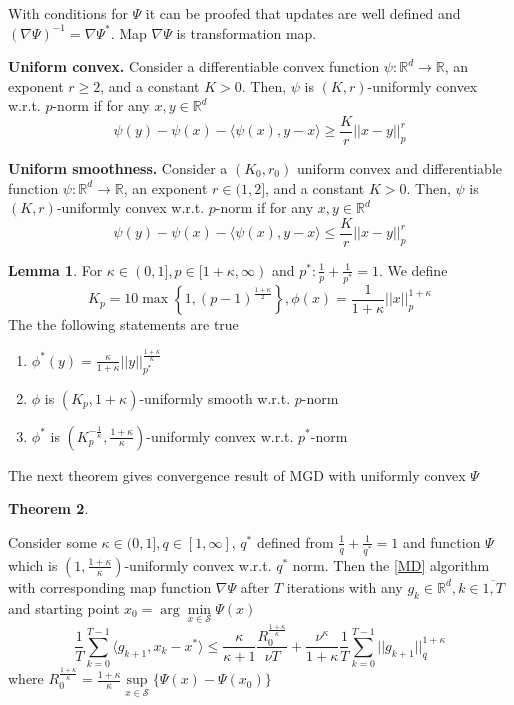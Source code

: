 \documentclass{article}
\newcommand{\RR}{\mathcal{R}}
\theoremstyle{definition}
\newtheorem{theorem}{Theorem}
\newtheorem{lemma}[theorem]{Lemma}
\theoremstyle{remark}
\def\RR{\mathbb{R}}
\begin{document}
With conditions for $\Psi$ it can be proofed that updates are well defined and $(\nabla \Psi)^{-1} = \nabla \Psi^*$. Map $\nabla \Psi$ is transformation map.




\textbf{Uniform convex.} Consider a differentiable convex function $\psi : \RR^d \rightarrow \RR$, an exponent $r \geq 2$, and a constant $K > 0$. Then, $\psi$ is $(K,r)$-uniformly convex w.r.t. $p$-norm if for any $x,y \in \RR^d$
$$\psi(y) - \psi(x)- \langle \psi(x), y -x \rangle \geq \frac{K}{r}||x-y||^r_p$$

\textbf{Uniform smoothness.} Consider a $(K_0,r_0)$ uniform convex and differentiable function $\psi : \RR^d \rightarrow \RR$, an exponent $r \in (1, 2]$, and a constant $K > 0$. Then, $\psi$ is $(K,r)$-uniformly convex w.r.t. $p$-norm if for any $x,y \in \RR^d$
$$\psi(y) - \psi(x)- \langle \psi(x), y -x \rangle \leq \frac{K}{r}||x-y||^r_p$$


\begin{lemma}\label{func}
For $\kappa\in (0,1], p \in [1 + \kappa, \infty)$ and $p^* : \frac{1}{p} + \frac{1}{p^*} = 1$. We define 
$$K_p  = 10\max\left\{ 1, (p-1)^{\frac{1+\kappa}{2}}\right\}, \phi(x) = \frac{1}{1+\kappa} ||x||_p^{1+\kappa}$$
The the following statements are true
\begin{enumerate}
    \item $\phi^*(y) = \frac{\kappa}{1 + \kappa} ||y||_{p^*}^{\frac{1+\kappa}{\kappa}}$
    \item $\phi$ is $(K_p, 1 +\kappa)$-uniformly smooth w.r.t. $p$-norm
    \item $\phi^*$ is $\left( K_p^{-\frac1\kappa}, \frac{1+\kappa}{\kappa} \right)$-uniformly convex w.r.t. $p^*$-norm
\end{enumerate}
\end{lemma}
The next theorem gives convergence result of MGD with uniformly convex $\Psi$
\begin{theorem}\label{MD convergence}

Consider some $\kappa \in (0,1] , q \in [1, \infty]$, $q^*$ defined from $\frac{1}{q} + \frac{1}{q^*} = 1$ and function $\Psi$ which is $\left( 1, \frac{1+\kappa}{\kappa}\right)$-uniformly convex w.r.t. $q^*$ norm. Then the \ref{MD} algorithm  with corresponding map function $\nabla \Psi$ after $T$ iterations with any $g_k \in \RR^d, k \in \overline{1, T}$ and starting point $x_0 =\arg\min\limits_{x \in \mathcal{S}} \Psi(x)$
$$\frac1T \sum \limits_{k=0}^{T-1} \langle g_{k+1}, x_k  -x^* \rangle \leq \frac{\kappa}{\kappa +1} \frac{R_0^{\frac{1+\kappa}{\kappa}} }{\nu T} + \frac{\nu^{\kappa}}{1+\kappa} \frac{1}{T} \sum \limits_{k=0}^{T-1} ||g_{k+1}||^{1+\kappa}_q$$
where $R_0^{\frac{1+\kappa}{\kappa}}=  \frac{1+\kappa}{\kappa} \sup\limits_{x \in \mathcal{S}} \{\Psi(x) - \Psi(x_0) \}$
\end{theorem}
\end{document}
